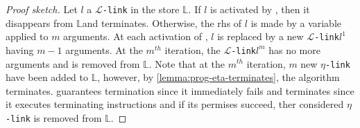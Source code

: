\documentclass[sigconf,natbib=false,review]{acmart}
\newcommand{\llambda}{\ensuremath{\mathcal{L}}\xspace}
\newcommand{\linkMacro}[1]{\ensuremath{#1}\texttt{-link}\xspace}
\newcommand{\linkbeta}{\linkMacro{\llambda}}
\newcommand{\linketa} {\linkMacro{\eta}}
\newcommand{\rhs}{rhs\xspace}
\newcommand{\linkStore}{\texorpdfstring{\ensuremath{\mathbb{L}}\xspace}{L}}
\begin{document}
\begin{proof}[Proof sketch]
  Let $l$ a \linkbeta in the store \linkStore. If $l$ is activated by
  \progBetaRH{}, then it disappears from \linkStore and 
  terminates. Otherwise, the \rhs of $l$ is made by a variable applied to $m$
  arguments. At each activation of \progBetaLL, $l$ is replaced by a new
  \linkbeta $l^1$ having $m-1$ arguments. At the $m^{th}$ iteration, the
  \linkbeta $l^m$ has no more arguments and is removed from \linkStore.
  Note that at the $m^{th}$ iteration, $m$ new \linketa have been added to
  \linkStore, however, by \cref{lemma:prog-eta-terminates}, the algorithm
  terminates. \progBetaFail guarantees termination since 
  it immediately fails and \progressetaright terminates since it executes 
  terminating instructions and if its permises succeed, ther considered
  \linketa is removed from \linkStore.
%
\end{proof}


\end{document}
